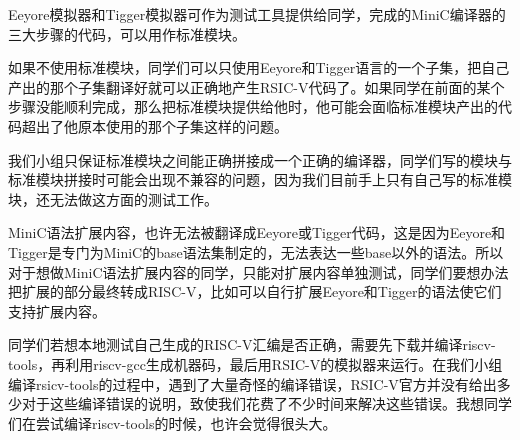 \documentclass[a4paper]{ctexart}
\begin{document}
Eeyore模拟器和Tigger模拟器可作为测试工具提供给同学，完成的MiniC编译器的三大步骤的代码，可以用作标准模块。

如果不使用标准模块，同学们可以只使用Eeyore和Tigger语言的一个子集，把自己产出的那个子集翻译好就可以正确地产生RSIC-V代码了。如果同学在前面的某个步骤没能顺利完成，那么把标准模块提供给他时，他可能会面临标准模块产出的代码超出了他原本使用的那个子集这样的问题。

我们小组只保证标准模块之间能正确拼接成一个正确的编译器，同学们写的模块与标准模块拼接时可能会出现不兼容的问题，因为我们目前手上只有自己写的标准模块，还无法做这方面的测试工作。

MiniC语法扩展内容，也许无法被翻译成Eeyore或Tigger代码，这是因为Eeyore和Tigger是专门为MiniC的base语法集制定的，无法表达一些base以外的语法。所以对于想做MiniC语法扩展内容的同学，只能对扩展内容单独测试，同学们要想办法把扩展的部分最终转成RISC-V，比如可以自行扩展Eeyore和Tigger的语法使它们支持扩展内容。

同学们若想本地测试自己生成的RISC-V汇编是否正确，需要先下载并编译riscv-tools，再利用riscv-gcc生成机器码，最后用RSIC-V的模拟器来运行。在我们小组编译rsicv-tools的过程中，遇到了大量奇怪的编译错误，RSIC-V官方并没有给出多少对于这些编译错误的说明，致使我们花费了不少时间来解决这些错误。我想同学们在尝试编译riscv-tools的时候，也许会觉得很头大。
\end{document}

